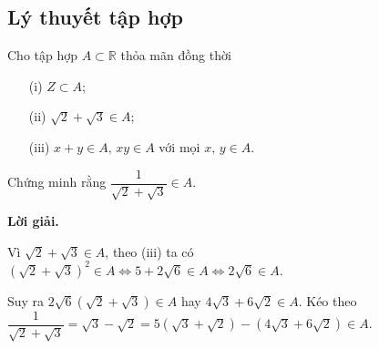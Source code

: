 \subsection{Lý thuyết tập hợp}

\begin{tcolorbox}[breakable]
    \begin{baitoan}\label{pb:w02:01}Cho tập hợp $A \subset \mathbb{R}$ thỏa mãn đồng thời

        \begin{enumerate}
            \item[(i)] {$Z \subset A$;}
            \item[(ii)] {$\sqrt{2}+\sqrt{3} \in A$;} 
            \item[(iii)] {$x+y \in A,\,xy \in A$ với mọi $x,\,y \in A$.} 
        \end{enumerate}

        Chứng minh rằng $\dfrac{1}{\sqrt{2}+\sqrt{3}} \in A$.
    \end{baitoan}
\end{tcolorbox}

\textbf{Lời giải. }

Vì $\sqrt{2}+\sqrt{3} \in A$, theo (iii) ta có $(\sqrt{2}+\sqrt{3})^2 \in A \iff 5+2\sqrt{6} \in A \iff 2\sqrt{6} \in A$.

Suy ra $2\sqrt{6}\left(\sqrt{2}+\sqrt{3}\right) \in A$ hay $4\sqrt{3} + 6\sqrt{2}\in A$. Kéo theo $\dfrac{1}{\sqrt{2} + \sqrt{3}} = \sqrt{3} - \sqrt{2} = 5(\sqrt{3}+\sqrt{2}) - (4\sqrt{3} + 6\sqrt{2}) \in A$.

